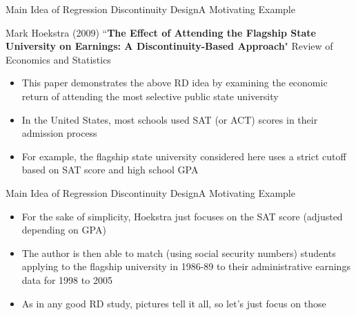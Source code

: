 \documentclass[hyperref={pdfpagelabels=false}]{beamer}
\begin{document}
\begin{frame}{Main Idea of Regression Discontinuity Design}{A Motivating Example}

Mark Hoekstra (2009) ``\textbf{The Effect of Attending the Flagship State University on Earnings: A Discontinuity-Based Approach}" Review of Economics and Statistics

\begin{itemize}

\item This paper demonstrates the above RD idea by examining the economic return of attending the most selective public state
university

\vspace{0.2cm}
\item In the United States, most schools used SAT (or ACT) scores in
their admission process
\vspace{0.2cm}
\item For example, the flagship state university considered here uses a strict cutoff based on SAT score and high school GPA

\end{itemize}
\end{frame}

\begin{frame}{Main Idea of Regression Discontinuity Design}{A Motivating Example}
\begin{itemize}

\item For the sake of simplicity, Hoekstra just focuses on the SAT score (adjusted depending on GPA)
\vspace{0.2cm}
\item The author is then able to match (using social security numbers) students applying to the flagship university in 1986-89 to their
administrative earnings data for 1998 to 2005
\vspace{0.2cm}
\item As in any good RD study, pictures tell it all, so let's just focus on
those

\end{itemize}
\end{frame}
\end{document}
